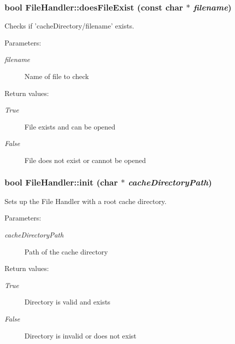 \subsubsection{\setlength{\rightskip}{0pt plus 5cm}bool File\-Handler::does\-File\-Exist (const char $\ast$ {\em filename})\hspace{0.3cm}{\tt  [static]}}\label{classoas_1_1FileHandler_e51fb8714e8599e444913cd96e81586d}


Checks if 'cache\-Directory/filename' exists. 

\begin{Desc}
\item[Parameters:]
\begin{description}
\item[{\em filename}]Name of file to check \end{description}
\end{Desc}
\begin{Desc}
\item[Return values:]
\begin{description}
\item[{\em True}]File exists and can be opened \item[{\em False}]File does not exist or cannot be opened \end{description}
\end{Desc}
\subsubsection{\setlength{\rightskip}{0pt plus 5cm}bool File\-Handler::init (char $\ast$ {\em cache\-Directory\-Path})\hspace{0.3cm}{\tt  [static]}}\label{classoas_1_1FileHandler_242c0ad92263c66a0362fc39b935f671}


Sets up the File Handler with a root cache directory. 

\begin{Desc}
\item[Parameters:]
\begin{description}
\item[{\em cache\-Directory\-Path}]Path of the cache directory \end{description}
\end{Desc}
\begin{Desc}
\item[Return values:]
\begin{description}
\item[{\em True}]Directory is valid and exists \item[{\em False}]Directory is invalid or does not exist \end{description}
\end{Desc}
